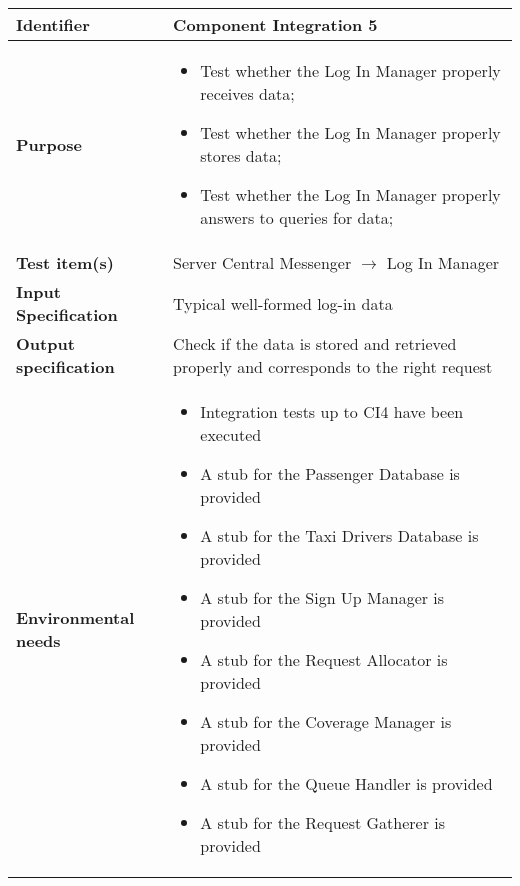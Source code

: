 \begin{center}
\begin{tabular}{lp{}}
\toprule
\textbf{Identifier}		&	Component Integration 5\\
\midrule
\textbf{Purpose}		&	\begin{itemize}
					\item Test whether the Log In Manager properly receives data;
					\item Test whether the Log In Manager properly stores data;
					\item Test whether the Log In Manager properly answers to queries for data;
					\end{itemize}	\\
\textbf{Test item(s)}	&	Server Central Messenger $\rightarrow$ Log In Manager\\
\textbf{Input Specification}	&	Typical well-formed log-in data\\
\textbf{Output specification}	&	Check if the data is stored and retrieved properly and corresponds to the right request\\
\textbf{Environmental needs}	&	\begin{itemize}
							\item Integration tests up to CI4 have been executed
							\item A stub for the Passenger Database is provided
							\item A stub for the Taxi Drivers Database is provided
							\item A stub for the Sign Up Manager is provided												\item A stub for the Request Allocator is provided
							\item A stub for the Coverage Manager is provided
							\item A stub for the Queue Handler is provided
							\item A stub for the Request Gatherer is provided
							\end{itemize}	\\
\bottomrule
\end{tabular}
\end{center}



